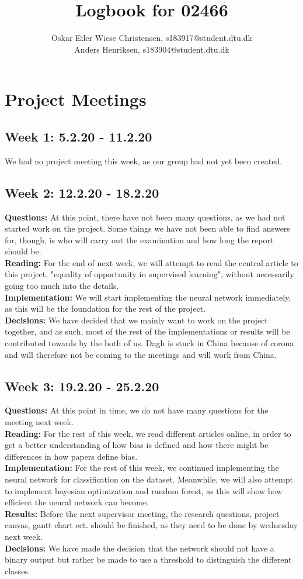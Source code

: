 \documentclass[11pt, fleqn]{article}
\title{Logbook for 02466}
\author{Oskar Eiler Wiese Christensen, s183917@student.dtu.dk \\ Anders Henriksen, s183904@student.dtu.dk}
\begin{document}
	\maketitle
	
\section*{Project Meetings}

\subsection*{Week 1: 5.2.20 - 11.2.20}
We had no project meeting this week, as our group had not yet been created.

\subsection*{Week 2: 12.2.20 - 18.2.20}
\textbf{Questions:} At this point, there have not been many questions, as we had not started work on the project. Some things we have not been able to find answers for, though, is who will carry out the examination and how long the report should be. \\
\textbf{Reading:} For the end of next week, we will attempt to read the central article to this project, "equality of opportunity in supervised learning", without necessarily going too much into the details. \\
\textbf{Implementation:} We will start implementing the neural network immediately, as this will be the foundation for the rest of the project. \\
\textbf{Decisions:} We have decided that we mainly want to work on the project together, and as such, most of the rest of the implementations or results will be contributed towards by the both of us. Dagh is stuck in China because of corona and will therefore not be coming to the meetings and will work from China.

\subsection*{Week 3: 19.2.20 - 25.2.20}
\textbf{Questions:} At this point in time, we do not have many questions for the meeting next week. \\
\textbf{Reading:} For the rest of this week, we read different articles online, in order to get a better understanding of how bias is defined and how there might be differences in how papers define bias. \\
\textbf{Implementation:} For the rest of this week, we continued implementing the neural network for classification on the dataset. Meanwhile, we will also attempt to implement bayesian optimization and random forest, as this will show how efficient the neural network can become. \\
\textbf{Results:} Before the next supervisor meeting, the research questions, project canvas, gantt chart ect. should be finished, as they need to be done by wednesday next week. \\
\textbf{Decisions:} We have made the decision that the network should not have a binary output but rather be made to use a threshold to distinguish the different classes.
\end{document}
